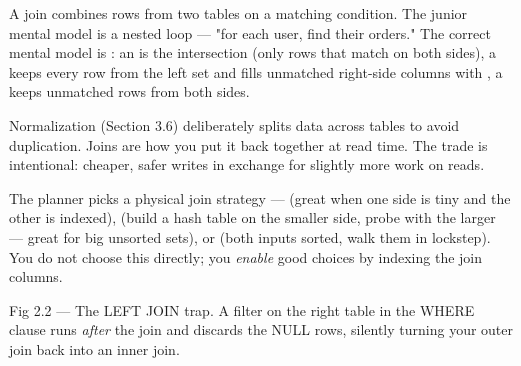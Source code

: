 

 A join combines rows from two tables on a matching condition. The junior mental model is a nested loop --- "for each user, find their orders." The correct mental model is : an  is the intersection (only rows that match on both sides), a  keeps every row from the left set and fills unmatched right-side columns with , a  keeps unmatched rows from both sides.

 Normalization (Section 3.6) deliberately splits data across tables to avoid duplication. Joins are how you put it back together at read time. The trade is intentional: cheaper, safer writes in exchange for slightly more work on reads.

 The planner picks a physical join strategy ---  (great when one side is tiny and the other is indexed),  (build a hash table on the smaller side, probe with the larger --- great for big unsorted sets), or  (both inputs sorted, walk them in lockstep). You do not choose this directly; you \emph{enable} good choices by indexing the join columns.

\begin{wbfigure}{Fig 2.2 — The LEFT JOIN trap. A filter on the right table in the WHERE clause runs \emph{after} the join and discards the NULL rows, silently turning your outer join back into an inner join.}
\end{wbfigure}

